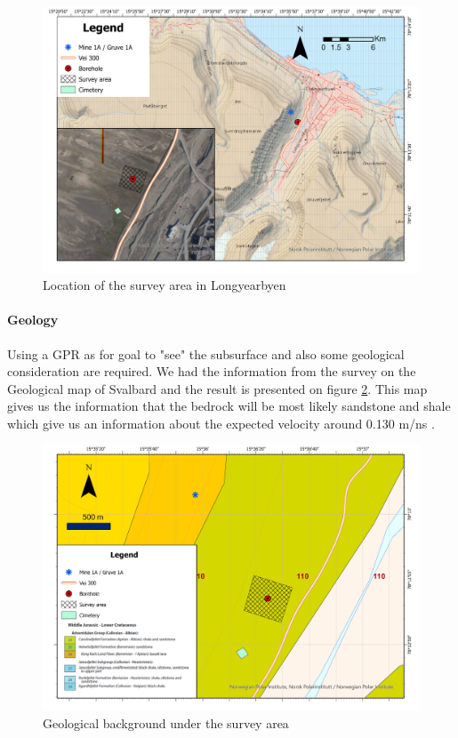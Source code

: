 \begin{figure}
    \centering
    \includegraphics[width=\linewidth]{Images/00_Methodology/GeographicSituation.jpg}
    \caption{Location of the survey area in Longyearbyen}
    \label{fig:Location}
\end{figure}


\paragraph{Geology} Using a GPR as for goal to "see" the subsurface and also some geological consideration are required. We had the information from the survey on the Geological map of Svalbard \cite{Atakan2015GeoscienceSvalbard} and the result is presented on figure \ref{fig:GeologicalBackground}. This map gives us the information that the bedrock will be most likely sandstone and shale which give us an information about the expected velocity around 0.130 m/ns \cite{GPRAnalysis}.

\begin{figure}
    \centering
    \includegraphics[width=\linewidth]{Images/00_Methodology/GeologicalSituationMap.jpg}
    \caption{Geological background under the survey area \cite{Atakan2015GeoscienceSvalbard}}
    \label{fig:GeologicalBackground}
\end{figure}

